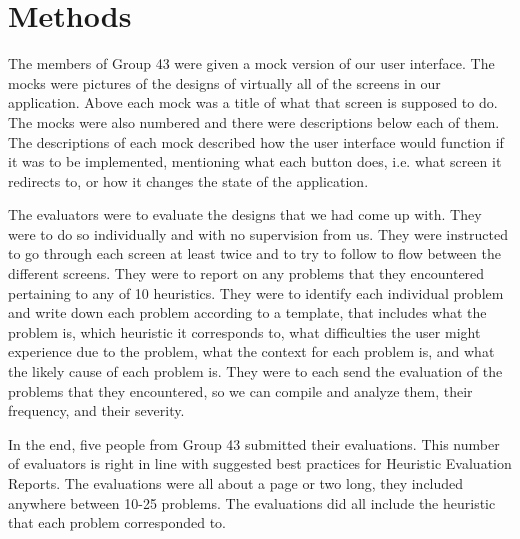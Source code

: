 \section{Methods}

The members of Group 43 were given a mock version of our user interface. The mocks were pictures of the designs of virtually all of the screens in our application. Above each mock was a title of what that screen is supposed to do. The mocks were also numbered and there were descriptions below each of them. The descriptions of each mock described how the user interface would function if it was to be implemented, mentioning what each button does, i.e. what screen it redirects to, or how it changes the state of the application.

The evaluators were to evaluate the designs that we had come up with. They were to do so individually and with no supervision from us. They were instructed to go through each screen at least twice and to try to follow to flow between the different screens. They were to report on any problems that they encountered pertaining to any of 10 heuristics. They were to identify each individual problem and write down each problem according to a template, that includes what the problem is, which heuristic it corresponds to, what difficulties the user might experience due to the problem, what the context for each problem is, and what the likely cause of each problem is. They were to each send the evaluation of the problems that they encountered, so we can compile and analyze them, their frequency, and their severity.

In the end, five people from Group 43 submitted their evaluations. This number of evaluators is right in line with suggested best practices for Heuristic Evaluation Reports. The evaluations were all about a page or two long, they included anywhere between 10-25 problems. The evaluations did all include the heuristic that each problem corresponded to.